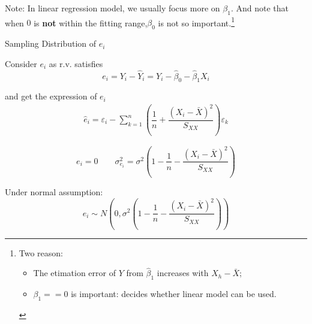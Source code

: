         
       
    
    Note: In linear regression model, we usually focus more on $ \beta_1 $. And note that when $ 0 $ is \textbf{not} within the fitting range,$ \beta_0 $ is not so important.\footnote{Two reason:\begin{itemize}[topsep=2pt,itemsep=2pt]
        \item The etimation error of $ Y $ from $ \hat{\beta}_1 $ increases with $ X_h-\bar{X} $;
        \item $ \beta_1==0  $ is important: decides whether linear model can be used. 
    \end{itemize}}


\begin{point}
    Sampling Distribution of $ e_i $ 
\end{point}
    Consider $ e_i $ as r.v. satisfies
    \begin{equation}
        e_i= Y_i-\hat{Y}_i=Y_i-\hat{\beta }_0-\hat{\beta }_1X_i
    \end{equation}

    and get the expression of $ {e}_i $
    \begin{equation}
        \begin{aligned}
            \hat{e}_i=\varepsilon _i-\sum_{k=1}^n\left( \dfrac{1}{n}+\dfrac{(X_i-\bar{X})^2}{S_{XX}} \right)\varepsilon _k
        \end{aligned}
    \end{equation}
    
    
    \begin{equation}
        e_i=0\qquad \sigma ^2_{e_i}=\sigma ^2 \left( 1-\dfrac{1}{n}-\dfrac{(X_i-\bar{X})^2}{S_{XX}} \right)
    \end{equation}

    Under normal assumption:
    \begin{equation}\label{EqaSamplingDistributionOfResiduals}
        e _i\sim N(0,\sigma ^2\left( 1-\dfrac{1}{n}-\dfrac{(X_i-\bar{X})^2}{S_{XX}} \right) ) 
    \end{equation}
    

